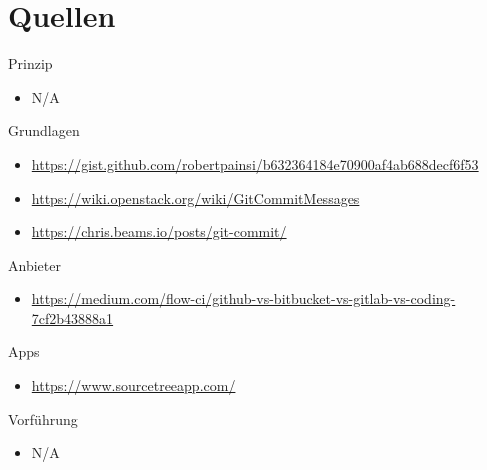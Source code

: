 \section*{Quellen}
\begin{frame}
\tiny
Prinzip
\begin{itemize}
\item N/A
\end{itemize}
Grundlagen
\begin{itemize}
\item \url{https://gist.github.com/robertpainsi/b632364184e70900af4ab688decf6f53}
\item \url{https://wiki.openstack.org/wiki/GitCommitMessages}
\item \url{https://chris.beams.io/posts/git-commit/}
\end{itemize}
Anbieter
\begin{itemize}
\item \url{https://medium.com/flow-ci/github-vs-bitbucket-vs-gitlab-vs-coding-7cf2b43888a1}
\end{itemize}
Apps
\begin{itemize}
\item \url{https://www.sourcetreeapp.com/}
\end{itemize}
Vorführung
\begin{itemize}
\item N/A
\end{itemize}
\end{frame}